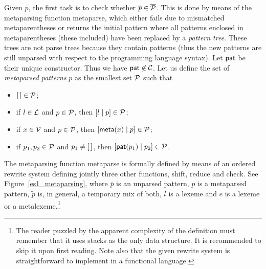 Given \(\overline{p}\), the first task is to check whether
\(\overline{p} \in \overline{\cal P}\). This is done by means of the
meta\-parsing function \textsf{metaparse}, which either fails due to
mismatched meta\-parentheses or returns the initial pattern where all
patterns enclosed in meta\-parentheses (these included) have been
replaced by a \emph{pattern tree}. These trees are not parse trees
because they contain patterns (thus the new patterns are still
unparsed with respect to the programming language syntax). Let
\(\textsf{pat}\) be their unique constructor. Thus we have
\(\textsf{pat} \not\in {\cal C}\). Let us define the set of
\emph{meta\-parsed patterns} \(p\) as the smallest set \({\cal P}\)
such that
\begin{itemize}

  \item \([\,] \in {\cal P}\);

  \item if \(l \in {\cal L}\) and \(p \in {\cal P}\), then
    \([{l}\mid{p}] \in {\cal P}\);

  \item if \(x \in {\cal V}\) and \(p \in {\cal P}\), then
    \([{\textsf{meta}(x)}\mid{p}] \in {\cal P}\);

  \item if \(p_1, p_2 \in {\cal P}\) and \(p_1 \neq [\,]\), then
    \([{\textsf{pat}(p_1)}\mid{p_2}] \in {\cal P}\).

\end{itemize}
The meta\-parsing function \textsf{metaparse} is formally defined by
means of an ordered rewrite system defining jointly three other
functions, \textsf{shift}, \textsf{reduce} and \textsf{check}. See
Figure~\ref{es1_metaparsing}, where \(\overline{p}\) is an unparsed
pattern, \(p\) is a meta\-parsed pattern, \(\tilde{p}\) is, in
general, a temporary mix of both, \(l\) is a lexeme and \(e\) is a
lexeme or a meta\-lexeme.\footnote{The reader puzzled by the apparent
  complexity of the definition must remember that it uses stacks as
  the only data structure. It is recommended to skip it upon first
  reading. Note also that the given rewrite system is straightforward
  to implement in a functional language.}
